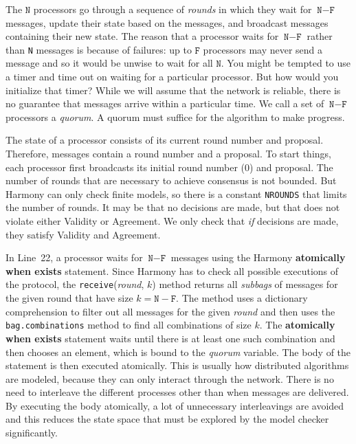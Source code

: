 \documentclass{report}
\begin{document}
The $\mathtt{N}$ processors go through a sequence of \emph{rounds} in which they wait for
$\texttt{N} - \texttt{F}$ messages, update their state based on the messages, and
broadcast messages containing their new state.
The reason that a processor waits for $\texttt{N} - \texttt{F}$ rather than \texttt{N}
messages is because of failures: up to $\texttt{F}$ processors may never send a message
and so it would be unwise to wait for all $\texttt{N}$.  You might be tempted to use
a timer and time out on waiting for a particular processor.  But how would you initialize
that timer?  While we will assume that the network is reliable, there is no guarantee
that messages arrive within a particular time.
We call a set of $\texttt{N} - \texttt{F}$ processors a \emph{quorum}.
A quorum must suffice for the algorithm to make progress.

The state of a processor consists
of its current round number and proposal.  Therefore, messages contain
a round number and a proposal. To start things, each processor first
broadcasts its initial round number (0) and proposal.
The number of rounds that are necessary to achieve consensus is not bounded.  But
Harmony can only check finite models, so there is a constant \texttt{NROUNDS} that
limits the number of rounds.  It may be that no decisions are made, but that does not
violate either Validity or Agreement.  We only check that \emph{if} decisions are
made, they satisfy Validity and Agreement.

In Line~22, a processor waits for $\texttt{N} - \texttt{F}$ messages using
the Harmony \textbf{atomically when exists} statement.
Since Harmony has to check all possible executions of the protocol, the
\texttt{receive}(\textit{round}, $k$) method returns all \emph{subbags} of messages
for the given round that have size $k = \texttt{N} - \texttt{F}$.  The method uses a
dictionary comprehension to filter out all messages for the given \textit{round}
and then uses the \texttt{bag.combinations} method to find all combinations of size $k$.
The \textbf{atomically when exists} statement waits until there is at least one such combination and
then chooses an element, which is bound to the \textit{quorum} variable.
The body of the statement is then executed atomically.
This is usually how distributed algorithms are modeled, because they can only interact
through the network.  There is no need to interleave the different processes other
than when messages are delivered.  By executing the body atomically, a lot of
unnecessary interleavings are avoided and this reduces the state space that must
be explored by the model checker significantly.
\end{document}
